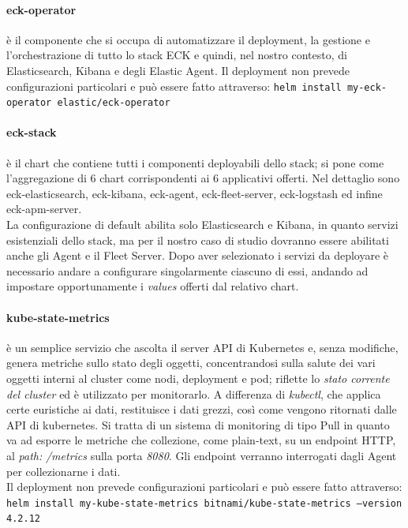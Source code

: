 \paragraph{eck-operator}
è il componente che si occupa di automatizzare il deployment, la gestione e l'orchestrazione di tutto lo stack \gls{ECK} e quindi, nel nostro contesto, di Elasticsearch, Kibana e degli Elastic Agent.
Il deployment non prevede configurazioni particolari e può essere fatto attraverso: \texttt{helm install my-eck-operator elastic/eck-operator}

\paragraph{eck-stack}
è il chart che contiene tutti i componenti deployabili dello stack;
si pone come l'aggregazione di 6 chart corrispondenti ai 6 applicativi offerti. Nel dettaglio sono eck-elasticsearch, eck-kibana, eck-agent, eck-fleet-server, eck-logstash ed infine eck-apm-server. \\
La configurazione di default abilita solo Elasticsearch e Kibana, in quanto servizi esistenziali dello stack, ma per il nostro caso di studio dovranno essere abilitati anche gli Agent e il Fleet Server.
Dopo aver selezionato i servizi da deployare è necessario andare a configurare singolarmente ciascuno di essi, andando ad impostare opportunamente i \textit{values} offerti dal relativo chart.

\paragraph{kube-state-metrics}
è un semplice servizio che ascolta il server \gls{API} di Kubernetes e, senza modifiche, genera metriche sullo stato degli oggetti, concentrandosi sulla salute dei vari oggetti interni al cluster come nodi, deployment e pod; riflette lo \emph{stato corrente del cluster} ed è utilizzato per monitorarlo.
A differenza di \emph{kubectl}, che applica certe euristiche ai dati, restituisce i dati grezzi, così come vengono ritornati dalle \gls{API} di kubernetes.
Si tratta di un sistema di monitoring di tipo Pull in quanto va ad esporre le metriche che collezione, come plain-text, su un endpoint HTTP, al \emph{path:} \emph{/metrics} sulla porta \emph{8080}.
Gli endpoint verranno interrogati dagli Agent per collezionarne i dati. \\
Il deployment non prevede configurazioni particolari e può essere fatto attraverso: \texttt{helm install my-kube-state-metrics bitnami/kube-state-metrics --version 4.2.12}

